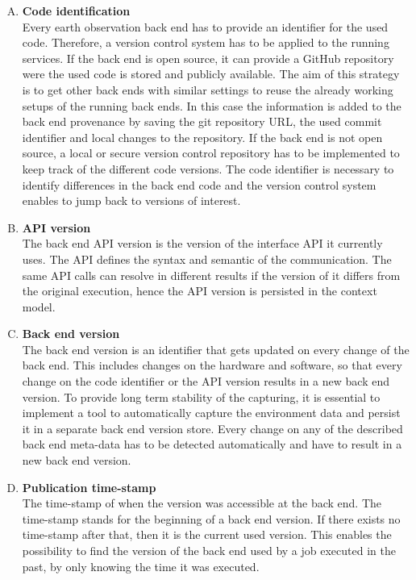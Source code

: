 \documentclass[draft,final]{vutinfth} %
\begin{document}
\begin{enumerate}[(A)]
	\item \textbf{Code identification} \\
	Every earth observation back end has to provide an identifier for the used code. Therefore, a version control system has to be applied to the running services. If the back end is open source, it can provide a GitHub repository were the used code is stored and publicly available. The aim of this strategy is to get other back ends with similar settings to reuse the already working setups of the running back ends. In this case the information is added to the back end provenance by saving the git repository URL, the used commit identifier and local changes to the repository. If the back end is not open source, a local or secure version control repository has to be implemented to keep track of the different code versions. The code identifier is necessary to identify differences in the back end code and the version control system enables to jump back to versions of interest. 
	\item \textbf{API version} \\
	The back end API version is the version of the interface API it currently uses. The API defines the syntax and semantic of the communication. The same API calls can resolve in different results if the version of it differs from the original execution, hence the API version is persisted in the context model.
	\item \textbf{Back end version} \\
	The back end version is an identifier that gets updated on every change of the back end. This includes changes on the hardware and software, so that every change on the code identifier or the API version results in a new back end version. To provide long term stability of the capturing, it is essential to implement a tool to automatically capture the environment data and persist it in a separate back end version store. Every change on any of the described back end meta-data has to be detected automatically and have to result in a new back end version.    
	\item \textbf{Publication time-stamp} \\
	The time-stamp of when the version was accessible at the back end. The time-stamp stands for the beginning of a back end version. If there exists no time-stamp after that, then it is the current used version. This enables the possibility to find the version of the back end used by a job executed in the past, by only knowing the time it was executed.     
\end{enumerate}
\end{document}
